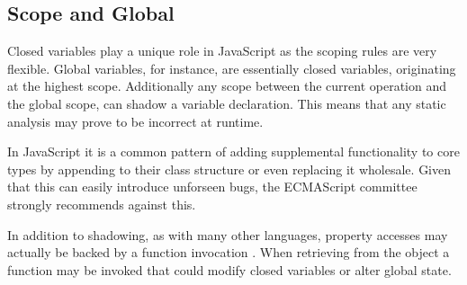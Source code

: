 \subsection{Scope and Global}

Closed variables play a unique role in JavaScript as the scoping rules are very flexible.  Global variables, for instance, are essentially closed variables, originating at the highest scope.  Additionally any scope between the current operation and the global scope, can shadow a variable declaration.  This means that any static analysis may prove to be incorrect at runtime.  

In JavaScript it is a common pattern of adding supplemental functionality to core types by appending to their class structure or even replacing it wholesale.  Given that this can easily introduce unforseen bugs, the ECMAScript committee strongly recommends against this. \cite{prototypeext16}

In addition to shadowing, as with many other languages, property accesses  may actually be backed by a function invocation \cite{getter16}.  When retrieving  from the object  a function may be invoked that could modify closed variables or alter global state.  